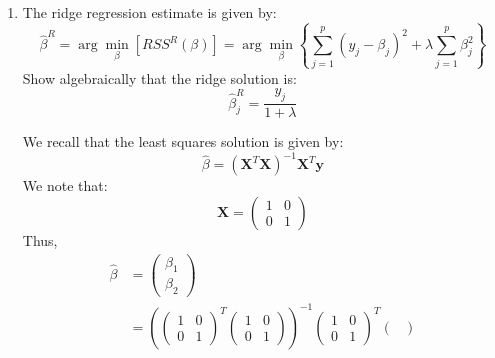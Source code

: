 \documentclass[11pt,twoside]{article}
\newcommand{\pts}[1]{\marginpar{ \small\hspace{0pt} \textit{[#1]} } }
\newcommand{\lt}{\left}
\newcommand{\rt}{\right}
\newcommand{\?}{\stackrel{?}{=}}
\newcommand{\fr}{\frac}
\newcommand{\bl}{\color{blue!80!black}}
\newcommand{\la}{\lambda}
\newenvironment{solution}
{\medskip\par\begin{adjustwidth}{.01\textwidth}{.01\textwidth}\bl}{\medskip\end{adjustwidth}}
\begin{document}
\begin{enumerate}[\bf (a)]
\item The ridge regression estimate is given by: \pts{5}
  \begin{equation}
    \label{eq:2}
    \hat\beta^{R} = \arg\min_{\beta}\lt[RSS^{R}(\beta)\rt] = \arg\min_{\beta}\lt\{\sum_{j=1}^{p} (y_{j} - \beta_{j})^{2} + \la\sum_{j=1}^{p}\beta_{j}^{2}\rt\} 
  \end{equation}
  Show algebraically that the ridge solution is:
  \begin{equation}
    \label{eq:3}
    \hat\beta_{j}^{R} = \fr{y_{j}}{1 + \la}
  \end{equation}
  

    \begin{solution}
    We recall that the least squares solution is given by:
    \begin{equation*}
      \hat\beta = (\bm X^T\bm X)^{-1}\bm X^T\bm y
    \end{equation*}
    We note that:
    \begin{equation*}
      \bm X =
      \begin{pmatrix}
        1 & 0 \\ 0 & 1
      \end{pmatrix}
    \end{equation*}
    Thus,
    \begin{align*}
      \hat\beta &=
                  \begin{pmatrix}
                    \beta_1 \\ \beta_2
                  \end{pmatrix} \\
                &=
\lt(
                  \begin{pmatrix}
                    1 &0 \\ 0 &1
                  \end{pmatrix}^T
                                \begin{pmatrix}
                                  1 &0 \\ 0 &1                                  
                                \end{pmatrix}\rt)^{-1} 
                                              \begin{pmatrix}
                                                1 &0 \\ 0 &1
                                              \end{pmatrix}^T
                                                            \begin{pmatrix}

\end{pmatrix}
\end{align*}
\end{solution}
\end{enumerate}
\end{document}
